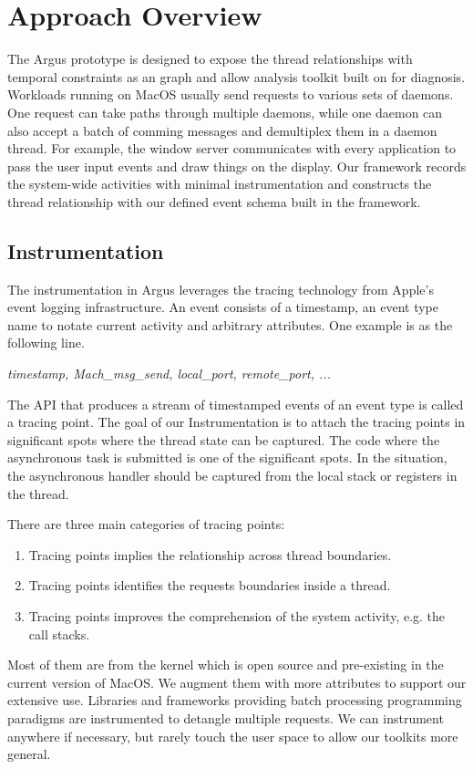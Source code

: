 \section{Approach Overview}
The Argus prototype is designed to expose the thread relationships with temporal constraints as an graph and allow analysis toolkit built on for diagnosis.
Workloads running on MacOS usually send requests to various sets of daemons.
One request can take paths through multiple daemons, while one daemon can also accept a batch of comming messages and demultiplex them in a daemon thread.
For example, the window server communicates with every application to pass the user input events and draw things on the display.
Our framework records the system-wide activities with minimal instrumentation and constructs the thread relationship with our defined event schema built in the framework.

\subsection{Instrumentation}
The instrumentation in Argus leverages the tracing technology from Apple's event logging infrastructure.
An event consists of a timestamp, an event type name to notate current activity and arbitrary attributes.
One example is as the following line.

\textit{timestamp, Mach\_msg\_send, local\_port, remote\_port, ...}

The API that produces a stream of timestamped events of an event type is called a tracing point.
The goal of our Instrumentation is to attach the tracing points in significant spots where the thread state can be captured.
The code where the asynchronous task is submitted is one of the significant spots.
In the situation, the asynchronous handler should be captured from the local stack or registers in the thread.

There are three main categories of tracing points:
\begin {enumerate}
	\item Tracing points implies the relationship across thread boundaries.
	\item Tracing points identifies the requests boundaries inside a thread.
	\item Tracing points improves the comprehension of the system activity, e.g. the call stacks.
\end{enumerate}

Most of them are from the kernel which is open source and pre-existing in the current version of MacOS.
We augment them with more attributes to support our extensive use.
Libraries and frameworks providing batch processing programming paradigms are instrumented to detangle multiple requests.
We can instrument anywhere if necessary, but rarely touch the user space to allow our toolkits more general.

